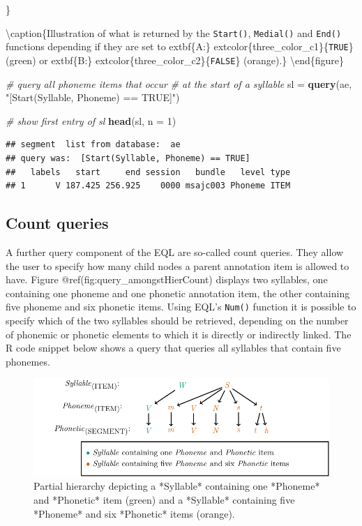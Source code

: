 \documentclass[]{book}
\newenvironment{Shaded}{\begin{snugshade}}{\end{snugshade}}
\newcommand{\CommentTok}[1]{\textcolor[rgb]{0.56,0.35,0.01}{\textit{#1}}}
\newcommand{\DataTypeTok}[1]{\textcolor[rgb]{0.13,0.29,0.53}{#1}}
\newcommand{\DecValTok}[1]{\textcolor[rgb]{0.00,0.00,0.81}{#1}}
\newcommand{\KeywordTok}[1]{\textcolor[rgb]{0.13,0.29,0.53}{\textbf{#1}}}
\newcommand{\NormalTok}[1]{#1}
\newcommand{\StringTok}[1]{\textcolor[rgb]{0.31,0.60,0.02}{#1}}
\theoremstyle{definition}
\theoremstyle{definition}
\theoremstyle{definition}
\theoremstyle{remark}
\begin{document}
\}

\textbackslash{}caption\{Illustration of what is returned by the
\texttt{Start()}, \texttt{Medial()} and \texttt{End()} functions
depending if they are set to extbf\{A:\}
extcolor\{three\_color\_c1\}\{\texttt{TRUE}\} (green) or extbf\{B:\}
extcolor\{three\_color\_c2\}\{\texttt{FALSE}\}
(orange).\}\label{fig:query-positionSimple} \textbackslash{}end\{figure\}

\begin{Shaded}
\begin{Highlighting}[]
\CommentTok{# query all phoneme items that occur}
\CommentTok{# at the start of a syllable}
\NormalTok{sl =}\StringTok{ }\KeywordTok{query}\NormalTok{(ae, }\StringTok{"[Start(Syllable, Phoneme) == TRUE]"}\NormalTok{)}

\CommentTok{# show first entry of sl}
\KeywordTok{head}\NormalTok{(sl, }\DataTypeTok{n =} \DecValTok{1}\NormalTok{)}
\end{Highlighting}
\end{Shaded}

\begin{verbatim}
## segment  list from database:  ae 
## query was:  [Start(Syllable, Phoneme) == TRUE] 
##   labels   start     end session   bundle   level type
## 1      V 187.425 256.925    0000 msajc003 Phoneme ITEM
\end{verbatim}

\hypertarget{subsec:query_countQueries}{%
\subsection{Count queries}\label{subsec:query_countQueries}}

A further query component of the EQL are so-called count queries. They
allow the user to specify how many child nodes a parent annotation item
is allowed to have. Figure @ref(fig:query\_amongstHierCount) displays
two syllables, one containing one phoneme and one phonetic annotation
item, the other containing five phoneme and six phonetic items. Using
EQL's \texttt{Num()} function it is possible to specify which of the two
syllables should be retrieved, depending on the number of phonemic or
phonetic elements to which it is directly or indirectly linked. The R
code snippet below shows a query that queries all syllables that contain
five phonemes.

\begin{figure}

{\centering \includegraphics[width=0.75\linewidth]{pics/amongstHierCount} 

}

\caption{Partial hierarchy depicting a *Syllable* containing one *Phoneme* and  *Phonetic* item (green) and a *Syllable* containing five *Phoneme* and six *Phonetic* items (orange).}\label{fig:query-amongstHierCount}
\end{figure}
\end{document}
